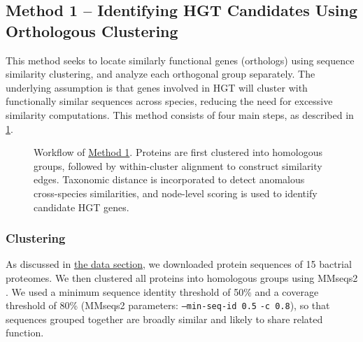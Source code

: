 \documentclass[11pt]{article}
\begin{document}
	\subsection{Method 1 -- Identifying HGT Candidates Using Orthologous Clustering}
	\label{subsec:method1}
	This method seeks to locate similarly functional genes (orthologs) using sequence similarity clustering, and analyze each orthogonal group separately.
	The underlying assumption is that genes involved in HGT will cluster with functionally similar sequences across species, reducing the need for excessive similarity computations. This method consists of four main steps, as described in \cref{fig:method1-workflow}.
	\begin{figure}[htbp]
		\centering
		
		\caption{Workflow of \hyperref[subsec:method1]{Method 1}. Proteins are first clustered into homologous groups, followed by within-cluster alignment to construct similarity edges. Taxonomic distance is incorporated to detect anomalous cross-species similarities, and node-level scoring is used to identify candidate HGT genes.}
		\label{fig:method1-workflow}
	\end{figure}
	
	\subsubsection{Clustering}
	As discussed in \hyperref[sec:data]{the data section}, we downloaded protein sequences of 15 bactrial proteomes. We then clustered all proteins into homologous groups using MMseqs2 \cite{Steinegger2017MMseqs2}. We used a minimum sequence identity threshold of 50\% and a coverage threshold of 80\% (MMseqs2 parameters: \texttt{--min-seq-id 0.5} \texttt{-c 0.8}), so that sequences grouped together are broadly similar and likely to share related function.
	
\end{document}
